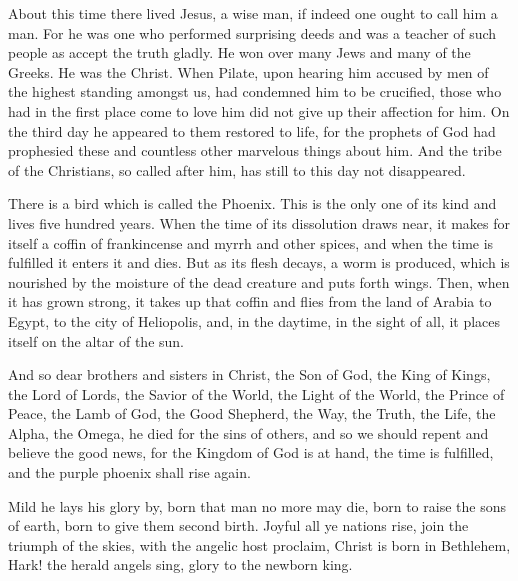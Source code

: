 About this time there lived Jesus, a wise man, if indeed one ought to call him a man.
For he was one who performed surprising deeds and was a teacher of such people as accept the truth gladly.
He won over many Jews and many of the Greeks.
He was the Christ.
When Pilate, upon hearing him accused by men of the highest standing amongst us, had condemned him to be crucified, those who had in the first place come to love him did not give up their affection for him.
On the third day he appeared to them restored to life, for the prophets of God had prophesied these and countless other marvelous things about him.
And the tribe of the Christians, so called after him, has still to this day not disappeared.

There is a bird which is called the Phoenix.
This is the only one of its kind and lives five hundred years.
When the time of its dissolution draws near, it makes for itself a coffin of frankincense and myrrh and other spices, and when the time is fulfilled it enters it and dies.
But as its flesh decays, a worm is produced, which is nourished by the moisture of the dead creature and puts forth wings.
Then, when it has grown strong, it takes up that coffin and flies from the land of Arabia to Egypt, to the city of Heliopolis, and, in the daytime, in the sight of all, it places itself on the altar of the sun.

And so dear brothers and sisters in Christ, the Son of God, the King of Kings, the Lord of Lords, the Savior of the World, the Light of the World, the Prince of Peace, the Lamb of God, the Good Shepherd, the Way, the Truth, the Life, the Alpha, the Omega, he died for the sins of others, and so we should repent and believe the good news, for the Kingdom of God is at hand, the time is fulfilled, and the purple phoenix shall rise again.

Mild he lays his glory by, born that man no more may die, born to raise the sons of earth, born to give them second birth.
Joyful all ye nations rise, join the triumph of the skies, with the angelic host proclaim, Christ is born in Bethlehem, Hark!
the herald angels sing, glory to the newborn king.
